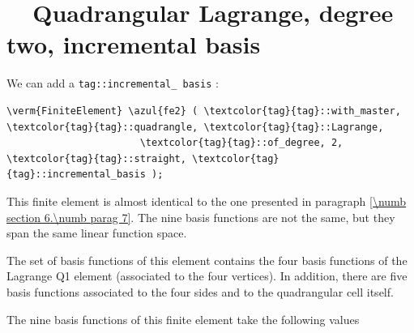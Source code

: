 \section{~~Quadrangular Lagrange, degree two, incremental basis}
\label{\numb section 6.\numb parag 8}

We can add a {\small\tt\textcolor{tag}{tag}::incremental\_\,basis} :

\begin{Verbatim}[commandchars=\\\{\},formatcom=\small\tt,frame=single,
   label=parag-\ref{\numb section 6.\numb parag 8}.cpp,rulecolor=\color{moldura},
   baselinestretch=0.94,framesep=2mm                                            ]
   \verm{FiniteElement} \azul{fe2} ( \textcolor{tag}{tag}::with_master, \textcolor{tag}{tag}::quadrangle, \textcolor{tag}{tag}::Lagrange,
                       \textcolor{tag}{tag}::of_degree, 2, \textcolor{tag}{tag}::straight, \textcolor{tag}{tag}::incremental_basis );
\end{Verbatim}

This finite element is almost identical to the one presented in paragraph
\ref{\numb section 6.\numb parag 7}.
The nine basis functions are not the same, but they span the same linear function space.

The set of basis functions of this element contains the four basis functions of the
Lagrange Q1 element (associated to the four vertices).
In addition, there are five basis functions associated to the four sides and to the
quadrangular cell itself.

The nine basis functions of this finite element take the following values


